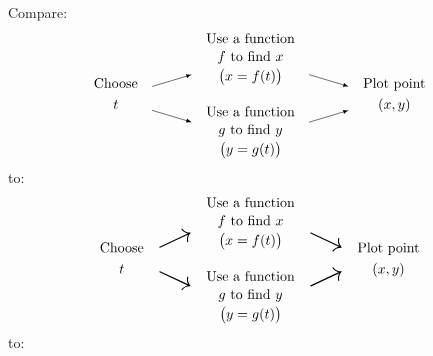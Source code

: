 \documentclass[10pt]{book}
\begin{document}
Compare: %
\[
\begin{gathered}\text{Choose}\\t\end{gathered}\quad
\tikz[>=latex,baseline=(current bounding box.center)]{\draw[->](0,.3)--(1,.6);\draw[->](0,-.3)--(1,-.6);}\quad
{\addtolength{\jot}{-.5ex}
\begin{gathered}
\text{Use a function}\\f\text{ to find }x\\\bigl(x=f(t)\bigr)\\~\\
\text{Use a function}\\g\text{ to find }y\\\bigl(y=g(t)\bigr)
\end{gathered}
}\quad
\tikz[>=latex,baseline=(current bounding box.center)]{\draw[->](0,.6)--(1,.3);\draw[->](0,-.6)--(1,-.3);}\quad
\begin{gathered}\text{Plot point}\\(x,y)\end{gathered}
\]
to:
\[
\begin{gathered}\text{Choose}\\t\end{gathered}\quad
\begin{gathered}
\rotatebox{-20}{\scalebox{2}{$\nearrow$}}\\
\rotatebox{20}{\scalebox{2}{$\searrow$}}
\end{gathered}\quad
{\addtolength{\jot}{-.5ex}
\begin{gathered}
\text{Use a function}\\f\text{ to find }x\\\bigl(x=f(t)\bigr)\\~\\
\text{Use a function}\\g\text{ to find }y\\\bigl(y=g(t)\bigr)
\end{gathered}
}\quad
\begin{gathered}
\rotatebox{20}{\scalebox{2}{$\searrow$}}\\
\rotatebox{-20}{\scalebox{2}{$\nearrow$}}
\end{gathered}\quad
\begin{gathered}\text{Plot point}\\(x,y)\end{gathered}
\]
to:
\begin{center}
\end{center}
\end{document}
